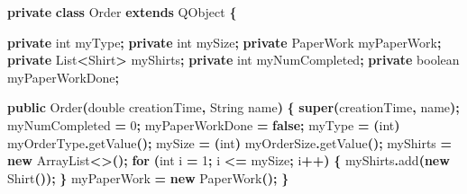 \documentclass[
]{book}
\newenvironment{Shaded}{\begin{snugshade}}{\end{snugshade}}
\newcommand{\BuiltInTok}[1]{#1}
\newcommand{\ControlFlowTok}[1]{\textcolor[rgb]{0.13,0.29,0.53}{\textbf{#1}}}
\newcommand{\DataTypeTok}[1]{\textcolor[rgb]{0.13,0.29,0.53}{#1}}
\newcommand{\DecValTok}[1]{\textcolor[rgb]{0.00,0.00,0.81}{#1}}
\newcommand{\FunctionTok}[1]{\textcolor[rgb]{0.00,0.00,0.00}{#1}}
\newcommand{\KeywordTok}[1]{\textcolor[rgb]{0.13,0.29,0.53}{\textbf{#1}}}
\newcommand{\NormalTok}[1]{#1}
\newcommand{\OperatorTok}[1]{\textcolor[rgb]{0.81,0.36,0.00}{\textbf{#1}}}
\theoremstyle{definition}
\theoremstyle{definition}
\theoremstyle{definition}
\theoremstyle{definition}
\theoremstyle{remark}
\begin{document}
\begin{Shaded}
\begin{Highlighting}[]
    \KeywordTok{private} \KeywordTok{class}\NormalTok{ Order }\KeywordTok{extends}\NormalTok{ QObject }\OperatorTok{\{}

        \KeywordTok{private} \DataTypeTok{int}\NormalTok{ myType}\OperatorTok{;}
        \KeywordTok{private} \DataTypeTok{int}\NormalTok{ mySize}\OperatorTok{;}
        \KeywordTok{private}\NormalTok{ PaperWork myPaperWork}\OperatorTok{;}
        \KeywordTok{private} \BuiltInTok{List}\OperatorTok{\textless{}}\NormalTok{Shirt}\OperatorTok{\textgreater{}}\NormalTok{ myShirts}\OperatorTok{;}
        \KeywordTok{private} \DataTypeTok{int}\NormalTok{ myNumCompleted}\OperatorTok{;}
        \KeywordTok{private} \DataTypeTok{boolean}\NormalTok{ myPaperWorkDone}\OperatorTok{;}

        \KeywordTok{public} \FunctionTok{Order}\OperatorTok{(}\DataTypeTok{double}\NormalTok{ creationTime}\OperatorTok{,} \BuiltInTok{String}\NormalTok{ name}\OperatorTok{)} \OperatorTok{\{}
            \KeywordTok{super}\OperatorTok{(}\NormalTok{creationTime}\OperatorTok{,}\NormalTok{ name}\OperatorTok{);}
\NormalTok{            myNumCompleted }\OperatorTok{=} \DecValTok{0}\OperatorTok{;}
\NormalTok{            myPaperWorkDone }\OperatorTok{=} \KeywordTok{false}\OperatorTok{;}
\NormalTok{            myType }\OperatorTok{=} \OperatorTok{(}\DataTypeTok{int}\OperatorTok{)}\NormalTok{ myOrderType}\OperatorTok{.}\FunctionTok{getValue}\OperatorTok{();}
\NormalTok{            mySize }\OperatorTok{=} \OperatorTok{(}\DataTypeTok{int}\OperatorTok{)}\NormalTok{ myOrderSize}\OperatorTok{.}\FunctionTok{getValue}\OperatorTok{();}
\NormalTok{            myShirts }\OperatorTok{=} \KeywordTok{new} \BuiltInTok{ArrayList}\OperatorTok{\textless{}\textgreater{}();}
            \ControlFlowTok{for} \OperatorTok{(}\DataTypeTok{int}\NormalTok{ i }\OperatorTok{=} \DecValTok{1}\OperatorTok{;}\NormalTok{ i }\OperatorTok{\textless{}=}\NormalTok{ mySize}\OperatorTok{;}\NormalTok{ i}\OperatorTok{++)} \OperatorTok{\{}
\NormalTok{                myShirts}\OperatorTok{.}\FunctionTok{add}\OperatorTok{(}\KeywordTok{new} \FunctionTok{Shirt}\OperatorTok{());}
            \OperatorTok{\}}
\NormalTok{            myPaperWork }\OperatorTok{=} \KeywordTok{new} \FunctionTok{PaperWork}\OperatorTok{();}
        \OperatorTok{\}}
\end{Highlighting}
\end{Shaded}
\end{document}
